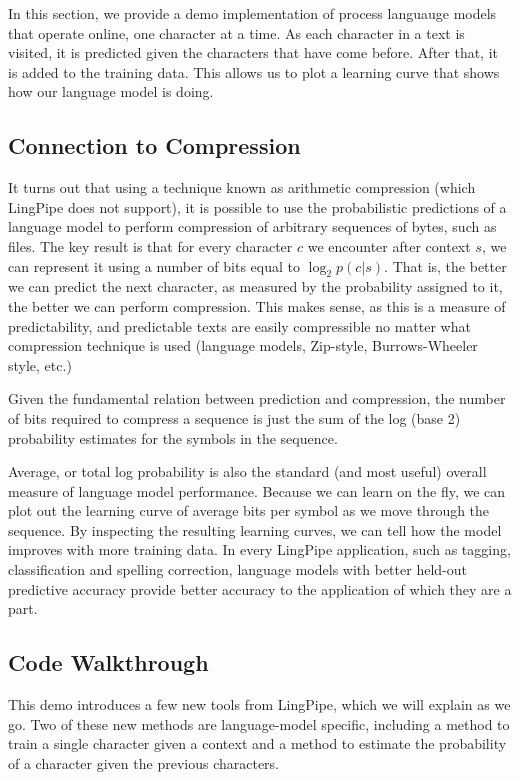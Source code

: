 In this section, we provide a demo implementation of process languauge
models that operate online, one character at a time.  As each
character in a text is visited, it is predicted given the characters
that have come before.  After that, it is added to the training data.
This allows us to plot a learning curve that shows how our language
model is doing. 

\subsection{Connection to Compression}

It turns out that using a technique known as arithmetic compression
(which LingPipe does not support), it is possible to use the
probabilistic predictions of a language model to perform compression
of arbitrary sequences of bytes, such as files.  The key result is
that for every character $c$ we encounter after context $s$, we can
represent it using a number of bits equal to $\log_2 p(c|s)$.  That
is, the better we can predict the next character, as measured by the
probability assigned to it, the better we can perform compression.
This makes sense, as this is a measure of predictability, and
predictable texts are easily compressible no matter what compression
technique is used (language models, Zip-style, Burrows-Wheeler style,
etc.)  

Given the fundamental relation between prediction and compression, 
the number of bits required to compress a sequence is just the
sum of the log (base 2) probability estimates for the symbols in
the sequence.

Average, or total log probability is also the standard (and most
useful) overall measure of language model performance.  Because we can
learn on the fly, we can plot out the learning curve of average bits
per symbol as we move through the sequence.  By inspecting the
resulting learning curves, we can tell how the model improves with
more training data.  In every LingPipe application, such as tagging,
classification and spelling correction, language models with better
held-out predictive accuracy provide better accuracy to the
application of which they are a part.


\subsection{Code Walkthrough}

This demo introduces a few new tools from LingPipe, which we will
explain as we go.  Two of these new methods are language-model
specific, including a method to train a single character given a
context and a method to estimate the probability of a character given
the previous characters.

